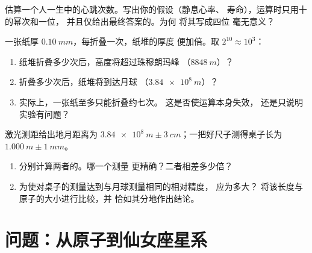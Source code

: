\begin{exercise}[$\star\star\star$]\label{exo:g10:orders-of-magnitude:13}
估算一个人一生中的心跳次数。写出你的假设（静息心率、
寿命），运算时只用十的幂次和一位，
并且仅给出最终答案的。为何
将其写成四位
毫无意义？
\end{exercise}

\begin{exercise}[$\star\star\star$]\label{exo:g10:orders-of-magnitude:14}
一张纸厚 $\qty{0.10}{mm}$，每折叠一次，纸堆的厚度
便加倍。取 $2^{10} \approx 10^{3}$：
\begin{enumerate}
  \item 纸堆折叠多少次后，高度将超过珠穆朗玛峰
        （$\qty{8848}{m}$）？
  \item 折叠多少次后，纸堆将到达月球
        （$\qty{3.84e8}{m}$）？
  \item 实际上，一张纸至多只能折叠约七次。
        这是否使运算本身失效，
        还是只说明实验有问题？
\end{enumerate}
\end{exercise}

\begin{exercise}[$\star\star\star$]\label{exo:g10:orders-of-magnitude:15}
激光测距给出地月距离为
$\qty{3.84e8}{m} \pm \qty{3}{cm}$；一把好尺子测得桌子长为
$\qty{1.000}{m} \pm \qty{1}{mm}$。
\begin{enumerate}
  \item 分别计算两者的。哪一个测量
        更精确？二者相差多少倍？
  \item 为使对桌子的测量达到与月球测量相同的相对精度，
        应为多大？
        将该长度与原子的大小进行比较，并
        恰如其分地作出结论。
\end{enumerate}
\end{exercise}

\section{问题：从原子到仙女座星系}

